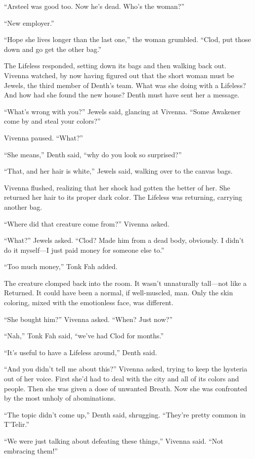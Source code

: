 “Arsteel was good too. Now he’s dead. Who’s the woman?”

“New employer.”

“Hope she lives longer than the last one,” the woman grumbled. “Clod, put those down and go get the other bag.”

The Lifeless responded, setting down its bags and then walking back out. Vivenna watched, by now having figured out that the short woman must be Jewels, the third member of Denth’s team. What was she doing with a Lifeless? And how had she found the new house? Denth must have sent her a message.

“What’s wrong with you?” Jewels said, glancing at Vivenna. “Some Awakener come by and steal your colors?”

Vivenna paused. “What?”

“She means,” Denth said, “why do you look so surprised?”

“That, and her hair is white,” Jewels said, walking over to the canvas bags.

Vivenna flushed, realizing that her shock had gotten the better of her. She returned her hair to its proper dark color. The Lifeless was returning, carrying another bag.

“Where did that creature come from?” Vivenna asked.

“What?” Jewels asked. “Clod? Made him from a dead body, obviously. I didn’t do it myself—I just paid money for someone else to.”

“Too much money,” Tonk Fah added.

The creature clomped back into the room. It wasn’t unnaturally tall—not like a Returned. It could have been a normal, if well-muscled, man. Only the skin coloring, mixed with the emotionless face, was different.

“She bought him?” Vivenna asked. “When? Just now?”

“Nah,” Tonk Fah said, “we’ve had Clod for months.”

“It’s useful to have a Lifeless around,” Denth said.

“And you didn’t tell me about this?” Vivenna asked, trying to keep the hysteria out of her voice. First she’d had to deal with the city and all of its colors and people. Then she was given a dose of unwanted Breath. Now she was confronted by the most unholy of abominations.

“The topic didn’t come up,” Denth said, shrugging. “They’re pretty common in T’Telir.”

“We were just talking about defeating these things,” Vivenna said. “Not embracing them!”

